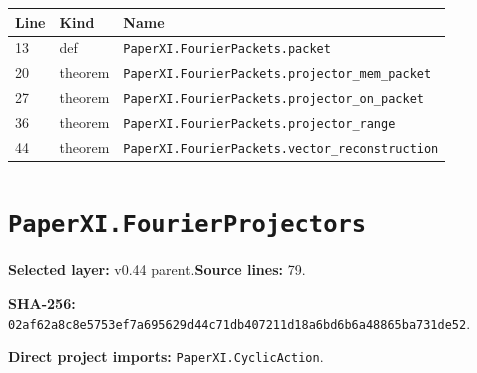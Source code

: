\documentclass[10pt,oneside]{book}
\begin{document}
\begin{longtable}{@{}p{}p{}p{}@{}}\toprule Line&Kind&Name\\\midrule\endhead

13&def&\nolinkurl{PaperXI.FourierPackets.packet}\\

20&theorem&\nolinkurl{PaperXI.FourierPackets.projector_mem_packet}\\

27&theorem&\nolinkurl{PaperXI.FourierPackets.projector_on_packet}\\

36&theorem&\nolinkurl{PaperXI.FourierPackets.projector_range}\\

44&theorem&\nolinkurl{PaperXI.FourierPackets.vector_reconstruction}\\

\bottomrule\end{longtable}

\section{\texorpdfstring{\nolinkurl{PaperXI.FourierProjectors}}{PaperXI.FourierProjectors}}\label{module:PaperXI.FourierProjectors}

\textbf{Selected layer:} v0.44 parent.\quad\textbf{Source lines:} 79.\par\textbf{SHA-256:} {\scriptsize\nolinkurl{02af62a8c8e5753ef7a695629d44c71db407211d18a6bd6b6a48865ba731de52}}.


\textbf{Direct project imports:} \nolinkurl{PaperXI.CyclicAction}.
\end{document}
